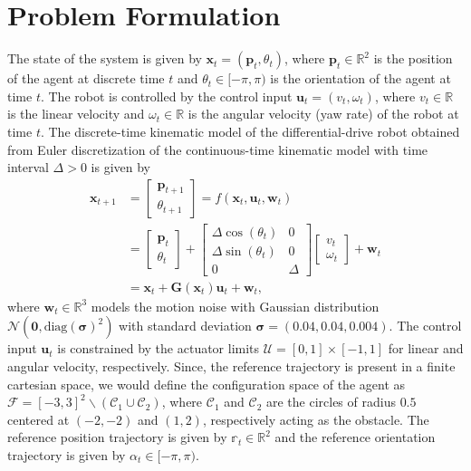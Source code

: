 \documentclass[conference]{IEEEtran}
\begin{document}
\section{Problem Formulation}
The state of the system is given by $\mathbf{x}_t = (\mathbf{p}_t, \theta_t)$, where $\mathbf{p}_t \in \mathbb{R}^2$ is the position of the agent at discrete time $t$ and $\theta_t \in [-\pi, \pi)$ is the orientation of the agent at time $t$.
The robot is controlled by the control input $\mathbf{u}_t = (v_t, \omega_t)$, where $v_t \in \mathbb{R}$ is the linear velocity and $\omega_t \in \mathbb{R}$ is the angular velocity (yaw rate) of the robot at time $t$.
The discrete-time kinematic model of the differential-drive robot obtained from Euler discretization of the continuous-time kinematic model with time interval $\Delta > 0$ is given by
\begin{align}\label{eq:kinematic_model}
    \mathbf{x}_{t+1} &= \begin{bmatrix}
        \mathbf{p}_{t+1} \\ \theta_{t+1}
    \end{bmatrix} = f(\mathbf{x}_t, \mathbf{u}_t, \mathbf{w}_t) \\
    &= \begin{bmatrix}
        \mathbf{p}_t \\ \theta_t \end{bmatrix} + \begin{bmatrix}
            \Delta \cos(\theta_t) & 0 \\ \Delta \sin(\theta_t) & 0 \\ 0 & \Delta
        \end{bmatrix} \begin{bmatrix}
            v_t \\ \omega_t
        \end{bmatrix} + \mathbf{w}_t \\
    &=  \mathbf{x}_t + \mathbf{G}(\mathbf{x}_t) \mathbf{u}_t + \mathbf{w}_t,
\end{align}
where $\mathbf{w}_t \in \mathbb{R}^3$ models the motion noise with Gaussian distribution $\mathcal{N}(\mathbf{0}, \text{diag}(\mathbf{\sigma})^2)$  with standard deviation $\mathbf{\sigma} = (0.04, 0.04, 0.004)$.
The control input $\mathbf{u}_t$ is constrained by the actuator limits $\mathcal{U} = [0,1] \times [-1, 1]$ for linear and angular velocity, respectively. Since, the reference 
trajectory is present in a finite cartesian space, we would define the configuration space of the agent as $ \mathcal{F} = [-3, 3]^2 \backslash (\mathcal{C}_1 \cup \mathcal{C}_2)$, where $\mathcal{C}_1$ and $\mathcal{C}_2$ are the circles of radius $0.5$ centered at $(-2, -2)$ and $(1, 2)$, respectively acting as the obstacle.
The reference position trajectory is given by $\mathbb{r}_t \in \mathbb{R}^2$ and the reference orientation trajectory is given by $\alpha_t \in [-\pi, \pi)$.
\end{document}
